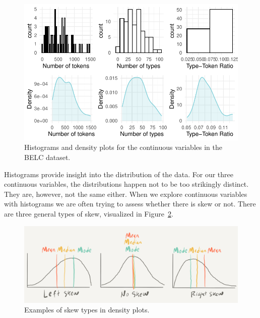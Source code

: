 \documentclass[
  letterpaper,
]{scrbook}
\begin{document}
\begin{figure}[h]

{\centering \includegraphics{./approaching-analysis_files/figure-pdf/fig-summaries-histograms-belc-1.pdf}

}

\caption{\label{fig-summaries-histograms-belc}Histograms and density
plots for the continuous variables in the BELC dataset.}

\end{figure}

Histograms provide insight into the distribution of the data. For our
three continuous variables, the distributions happen not to be too
strikingly distinct. They are, however, not the same either. When we
explore continuous variables with histograms we are often trying to
assess whether there is skew or not. There are three general types of
skew, visualized in Figure~\ref{fig-summaries-skew-graphic}.

\begin{figure}[h]

{\centering \includegraphics[width=7.13in,height=\textheight]{./figures/approaching-analysis/skew-types-paper.png}

}

\caption{\label{fig-summaries-skew-graphic}Examples of skew types in
density plots.}

\end{figure}
\end{document}
